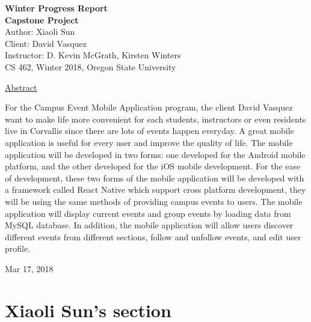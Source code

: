 \documentclass[letterpaper, 10pt,titlepage]{article}
\newcommand\tab[1][1cm]{\hspace*{#1}}
\begin{document}
\begin{titlepage}
\begin{center}
    \Huge
    \textbf{Winter Progress Report}\\
    \textbf{Capstone Project}\\
    \vspace{1.0cm}
    \large
    Author: Xiaoli Sun\\
    Client: David Vasquez\\
    \vspace{1.5cm}
    \large
    Instructor: D. Kevin McGrath, Kirsten Winters\\

    \large
    CS 462, Winter 2018, Oregon State University\\    

    \vspace{3.2cm}

    \large
    \underline{Abstract}\\
    \vspace{0.3cm}
    \end{center}
    \large

    \tab For the Campus Event Mobile Application program, the client David Vasquez want to make life more convenient for each students, instructors or even residents live in Corvallis since there are lots of events happen everyday. A great mobile application is useful for every user and improve the quality of life. The mobile application will be developed in two forms: one developed for the Android mobile platform, and the other developed for the iOS mobile development. For the ease of development, these two forms of the mobile application will be developed with a framework called React Native which support cross platform development, they will be using the same methods of providing campus events to users. The mobile application will display current events and group events by loading data from MySQL database. In addition, the mobile application will allow users discover different events from different sections, follow and unfollow events, and edit user profile. 
    \vspace{0.8cm}
    \vfill
    
\begin{center}    
    Mar 17, 2018

\end{center}
\end{titlepage}


\tableofcontents
\newpage

\section{Xiaoli Sun's section}
\end{document}
